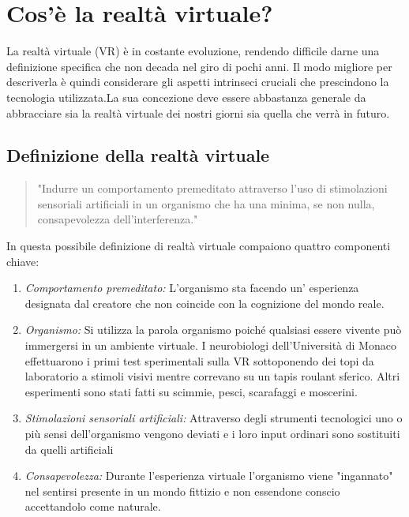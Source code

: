 \section{Cos'è la realtà virtuale?}

La realtà virtuale (VR) è in costante evoluzione, rendendo difficile darne una definizione specifica che non decada nel giro di pochi anni. Il modo migliore per descriverla è quindi considerare gli aspetti intrinseci cruciali che prescindono la tecnologia utilizzata.La sua concezione deve essere abbastanza generale da abbracciare sia la realtà virtuale dei nostri giorni sia quella che verrà in futuro.
\subsection{Definizione della realtà virtuale}

\begin{quotation}"Indurre un comportamento premeditato attraverso l'uso di stimolazioni sensoriali artificiali in un organismo che ha una minima, se non nulla, consapevolezza dell'interferenza."\cite{VRbook}
\end{quotation}	
In questa possibile definizione di realtà virtuale compaiono quattro componenti chiave:

\begin{enumerate}
	\item \textit{Comportamento premeditato:} L'organismo sta facendo un' esperienza designata dal creatore
	che non coincide con la cognizione del mondo reale.
	\item \textit{Organismo:} Si utilizza la parola organismo poiché qualsiasi essere vivente può immergersi in un ambiente virtuale. I neurobiologi dell'Università di Monaco effettuarono i primi test sperimentali sulla VR sottoponendo dei topi da laboratorio a stimoli visivi mentre correvano su un tapis roulant sferico. Altri esperimenti sono stati fatti su scimmie, pesci, scarafaggi e moscerini.
	\item \textit{Stimolazioni sensoriali artificiali:} Attraverso degli strumenti tecnologici uno o più sensi dell'organismo vengono deviati e i loro input ordinari sono sostituiti da quelli artificiali
	\item \textit{Consapevolezza:} Durante l'esperienza virtuale l'organismo viene "ingannato" nel sentirsi presente in un mondo fittizio e non essendone conscio accettandolo come naturale.
\end{enumerate}

